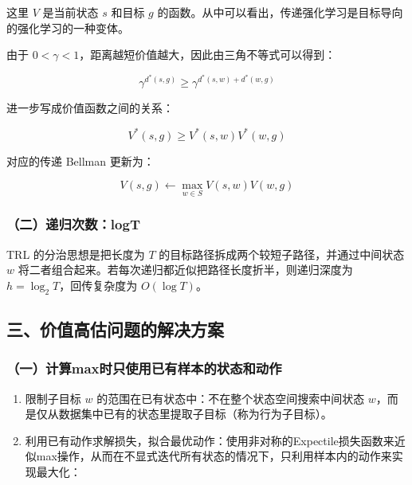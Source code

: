 这里 \(V\) 是当前状态 \(s\) 和目标 \(g\) 的函数。从中可以看出，传递强化学习是目标导向的强化学习的一种变体。

由于 \(0<\gamma<1\)，距离越短价值越大，因此由三角不等式可以得到：

\[
\gamma^{d^{*}(s,g)} \ge \gamma^{d^{*}(s,w)+d^{*}(w,g)}
\]

进一步写成价值函数之间的关系：

\[
V^{*}(s,g) \ge V^{*}(s,w)V^{*}(w,g)
\]

对应的传递 Bellman 更新为：

\[
V(s,g) \leftarrow \max_{w \in S} V(s,w)V(w,g)
\]

\hypertarget{ux4e8cux9012ux5f52ux6b21ux6570logt}{%
\subsubsection{（二）递归次数：logT}\label{ux4e8cux9012ux5f52ux6b21ux6570logt}}

TRL 的分治思想是把长度为 \(T\) 的目标路径拆成两个较短子路径，并通过中间状态 \(w\) 将二者组合起来。若每次递归都近似把路径长度折半，则递归深度为 \(h=\log_2 T\)，回传复杂度为 \(O(\log T)\)。

\hypertarget{ux4e09ux4ef7ux503cux9ad8ux4f30ux95eeux9898ux7684ux89e3ux51b3ux65b9ux6848}{%
\subsection{三、价值高估问题的解决方案}\label{ux4e09ux4ef7ux503cux9ad8ux4f30ux95eeux9898ux7684ux89e3ux51b3ux65b9ux6848}}

\hypertarget{ux4e00ux8ba1ux7b97maxux65f6ux53eaux4f7fux7528ux5df2ux6709ux6837ux672cux7684ux72b6ux6001ux548cux52a8ux4f5c}{%
\subsubsection{（一）计算max时只使用已有样本的状态和动作}\label{ux4e00ux8ba1ux7b97maxux65f6ux53eaux4f7fux7528ux5df2ux6709ux6837ux672cux7684ux72b6ux6001ux548cux52a8ux4f5c}}

\begin{enumerate}
\def\labelenumi{\arabic{enumi}.}
\item
  限制子目标 \(w\) 的范围在已有状态中：不在整个状态空间搜索中间状态 \(w\)，而是仅从数据集中已有的状态里提取子目标（称为行为子目标）。
\item
  利用已有动作求解损失，拟合最优动作：使用非对称的Expectile损失函数来近似max操作，从而在不显式迭代所有状态的情况下，只利用样本内的动作来实现最大化：
\end{enumerate}

